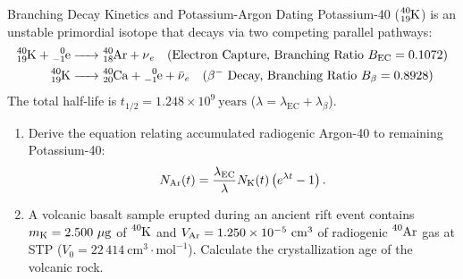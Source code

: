 \begin{exercise}{Branching Decay Kinetics and Potassium-Argon Dating}
Potassium-40 ($\ce{^{40}_{19}K}$) is an unstable primordial isotope that decays via two competing parallel pathways:
\begin{align*}
\ce{^{40}_{19}K + ^{0}_{-1}e &-> ^{40}_{18}Ar + \nu_e} \quad (\text{Electron Capture, Branching Ratio } B_{\text{EC}} = 0.1072) \\
\ce{^{40}_{19}K &-> ^{40}_{20}Ca + ^{0}_{-1}e + \bar{\nu}_e} \quad (\beta^-\text{ Decay, Branching Ratio } B_{\beta} = 0.8928)
\end{align*}
The total half-life is $t_{1/2} = 1.248 \times 10^9\ \mathrm{years}$ ($\lambda = \lambda_{\text{EC}} + \lambda_\beta$).
\begin{enumerate}[leftmargin=1.5em,itemsep=2pt]
  \item Derive the equation relating accumulated radiogenic Argon-40 to remaining Potassium-40:
  \[
  N_{\ce{Ar}}(t) = \frac{\lambda_{\text{EC}}}{\lambda} N_{\ce{K}}(t) \left( e^{\lambda t} - 1 \right).
  \]
  \item A volcanic basalt sample erupted during an ancient rift event contains $m_{\ce{K}} = 2.500\ \mu\mathrm{g}$ of $\ce{^{40}K}$ and $V_{\ce{Ar}} = 1.250 \times 10^{-5}\ \mathrm{cm^3}$ of radiogenic $\ce{^{40}Ar}$ gas at STP ($V_0 = 22\,414\ \mathrm{cm^3\cdot mol^{-1}}$).
  Calculate the crystallization age of the volcanic rock.
\end{enumerate}
\end{exercise}

\begin{tabletworkspace}[5.0cm]
\end{tabletworkspace}

